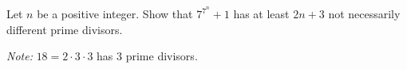 Let $n$ be a positive integer. Show that $7^{7^{n}}+1$ has at least $2n+3$ not necessarily different prime divisors.

\emph{Note:} $18 = 2\cdot 3\cdot 3$ has 3 prime divisors.
